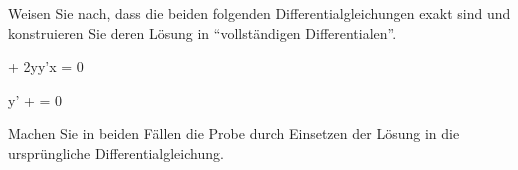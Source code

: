 \begin{atiTask}[
	title = Zwei exakte Differentialgleichungen,
	topic = Gewöhnliche Differentialgleichungen,
	subtopic = Exakte Differentialgleichungen: Der integrierende Faktor,
	language = Deutsch,
]
	Weisen Sie nach, dass die beiden folgenden Differentialgleichungen exakt sind und konstruieren Sie deren Lösung in \enquote{vollständigen Differentialen}.
	\begin{atiSubequations}
		\item{
			 + 2yy'\ln x = 0
		}
		\item{
			y' +  = 0
		}
	\end{atiSubequations}
	Machen Sie in beiden Fällen die Probe durch Einsetzen der Lösung in die ursprüngliche Differentialgleichung.
\end{atiTask}